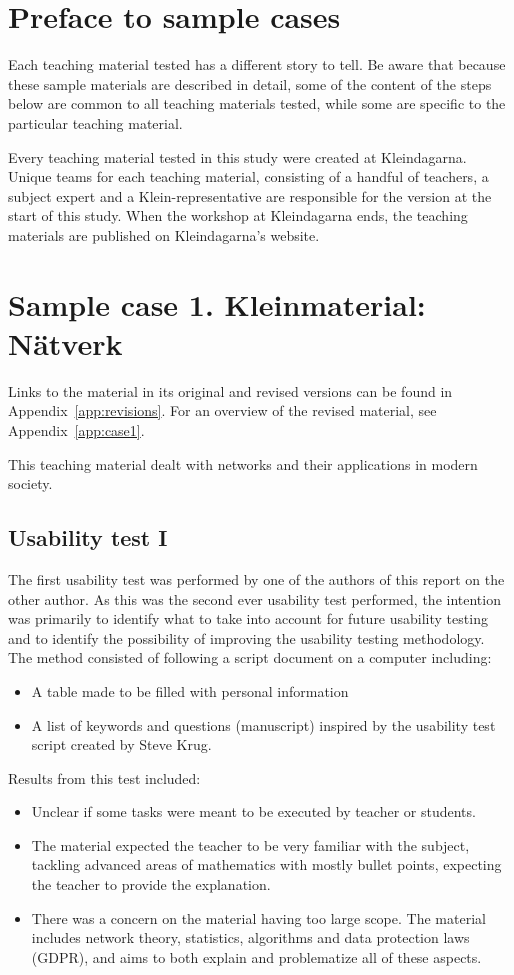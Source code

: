 \section{Preface to sample cases}
Each teaching material tested has a different story to tell. Be aware that because these sample materials are described in detail, some of the content of the steps below are common to all teaching materials tested, while some are specific to the particular teaching material.

Every teaching material tested in this study were created at Kleindagarna. Unique teams for each teaching material, consisting of a handful of teachers, a subject expert and a Klein-representative are responsible for the version at the start of this study. When the workshop at Kleindagarna ends, the teaching materials are published on Kleindagarna's website.

\section{Sample case 1. Kleinmaterial: Nätverk} \label{samplecase1}
Links to the material in its original and revised versions can be found in Appendix~\ref{app:revisions}. For an overview of the revised material, see Appendix~\ref{app:case1}. 

This teaching material dealt with networks and their applications in modern society.

\subsection{Usability test I}
The first usability test was performed by one of the authors of this report on the other author. As this was the second ever usability test performed, the intention was primarily to identify what to take into account for future usability testing and to identify the possibility of improving the usability testing methodology. The method consisted of following a script document on a computer including:
\begin{itemize}
    \item A table made to be filled with personal information
    \item A list of keywords and questions (manuscript) inspired by the usability test script created by Steve Krug.
\end{itemize}

Results from this test included:
\begin{itemize}
    \item Unclear if some tasks were meant to be executed by teacher or students.
    \item The material expected the teacher to be very familiar with the subject, tackling advanced areas of mathematics with mostly bullet points, expecting the teacher to provide the explanation.
    \item There was a concern on the material having too large scope. The material includes network theory, statistics, algorithms and data protection laws (GDPR), and aims to both explain and problematize all of these aspects.
\end{itemize}
